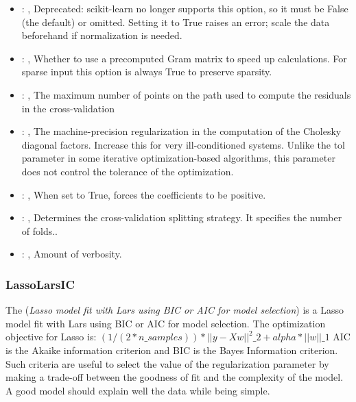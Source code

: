 \begin{itemize}
    \item {}: ,
      Deprecated: scikit-learn no longer supports this option, so it must be False (the default) or
      omitted.                                                  Setting it to True raises an error;
      scale the data beforehand if normalization is needed.

    \item {}: ,
      Whether to use a precomputed Gram matrix to speed up calculations.
      For sparse input this option is always True to preserve sparsity.

    \item {}: ,
      The maximum number of points on the path used to compute the residuals in
      the cross-validation

    \item {}: ,
      The machine-precision regularization in the computation of the Cholesky
      diagonal factors. Increase this for very ill-conditioned systems. Unlike the tol
      parameter in some iterative optimization-based algorithms, this parameter does not
      control the tolerance of the optimization.

    \item {}: ,
      When set to True, forces the coefficients to be positive.

    \item {}: ,
      Determines the cross-validation splitting strategy.
      It specifies the number of folds..

    \item {}: ,
      Amount of verbosity.
  \end{itemize}


\subsubsection{LassoLarsIC}
  The  (\textit{Lasso model fit with Lars using BIC or AIC for model
  selection})                         is a Lasso model fit with Lars using BIC or AIC for model
  selection.                         The optimization objective for Lasso is:
  $(1 / (2 * n\_samples)) * ||y - Xw||^2\_2 + alpha * ||w||\_1$                         AIC is the
  Akaike information criterion and BIC is the Bayes Information criterion. Such criteria
  are useful to select the value of the regularization parameter by making a trade-off between the
  goodness of fit and the complexity of the model. A good model should explain well the data
  while being simple.                         

